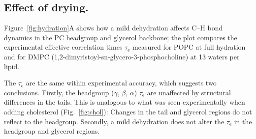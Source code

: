 \documentclass[journal=jpcbfk,manuscript=article,layout=twocolumn]{achemso}
\begin{document}
\subsection*{Effect of drying.}
Figure~\ref{fig:hydration}A shows how a mild dehydration affects
C--H bond dynamics in the PC headgroup and glycerol backbone;
the plot compares the experimental effective correlation times $\tau_\mathrm e$
measured for POPC at full hydration and for DMPC (1,2-dimyristoyl-sn-glycero-3-phosphocholine)
at 13 waters per lipid.


The $\tau_\mathrm e$ are the same within experimental accuracy, which suggests two conclusions. Firstly, 
the headgroup ($\gamma$, $\beta$, $\alpha$) $\tau_\mathrm e$ are unaffected by structural differences in the tails. This is analogous to  what was seen experimentally when adding cholesterol
(Fig.~\ref{fig:chol}): Changes in the tail and glycerol regions do not reflect to the headgroup. Secondly, a mild dehydration does not alter the $\tau_\mathrm e$
in the headgroup and glycerol regions. 
\end{document}
